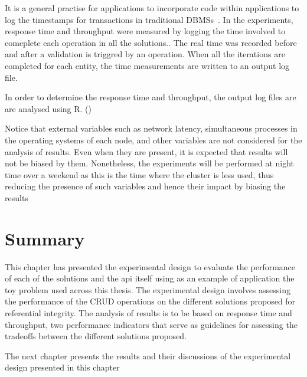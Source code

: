 It is a general practise for applications to incorporate code within
applications to log the timestamps for transactions in traditional
\acp{DBMS}~\citep{IBMPerformance}.
In the experiments, response time and throughput were measured by logging the
time involved to comeplete each operation in all the solutions..
The real time was recorded before and after a validation is triggred by an
operation. When all the iterations are completed for each entity, the time
measurements are written to an output log file.

In order to determine the response time and throughput, the output log files are
are analysed using R. ()



Notice that external variables such as network latency, simultaneous processes
in the operating systems of each node, and other variables are not considered
for the analysis of results. Even when they are present, it is expected that
results will not be biased by them. Nonetheless, the experiments will be
performed at night time over a weekend as this is the time where the cluster is
less used, thus reducing the presence of such variables and hence their impact
by biasing the results 

\section{Summary}
	This chapter has presented the experimental design to evaluate the performance
	of each of the solutions and the api itself using as an example of application
	the toy problem used across this thesis. The experimental design involves
	assessing the performance of the CRUD operations on the different solutions
	proposed for referential integrity. The analysis of results is to be based on
	response time and throughput, two performance indicators that serve as
	guidelines for assessing the tradeoffs between the different solutions
	proposed.
	
	
	The next chapter presents the results and their discussions of the
	experimental design presented in this chapter
 






